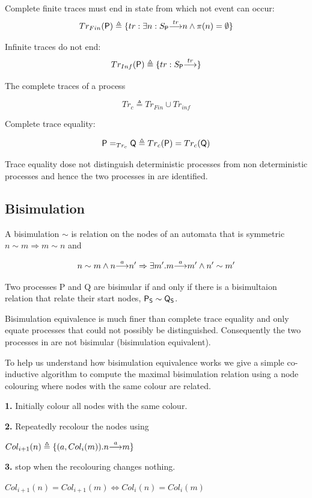 \documentclass[]{article}
\begin{document}
 Complete finite traces must end in state from which not event can occur:
 \[Tr_{Fin}({\sf P}) \triangleq \{ tr : \exists n : {S_{\sf P} }{\stackrel{tr}{\longrightarrow}}{n} \land \pi(n)=\emptyset\}\]

 Infinite traces  do not end:
 \[Tr_{Inf}({\sf P}) \triangleq \{ tr :  {S_{\sf P} }{\stackrel{tr}{\longrightarrow}}{} \}\]

 The  complete traces of a process

 \[Tr_c \triangleq Tr_{Fin}\cup Tr_{inf}\]

 Complete trace equality:

 \[{\sf P} =_{Tr_c} {\sf Q} \triangleq Tr_c({\sf P}) = Tr_c({\sf Q})\]

Trace equality dose not distinguish deterministic processes from non deterministic processes  and hence the two processes in  are identified.
 \subsection{Bisimulation}\label{sec:biscol}
  A bisimulation  $\sim$ is relation on the nodes of an automata  that is  symmetric  $n\sim m\Rightarrow m\sim n$  and

 \[ n\sim m \land {n}{\stackrel{a}{\longrightarrow}}{n'} \Rightarrow \exists m' . {m}{\stackrel{a}{\longrightarrow}}{m'}  \land n'\sim m' \]

 Two processes {\sf P} and {\sf Q} are bisimular if and only if there is a bisimultaion relation that relate their start nodes, ${\sf P_S\sim Q_S}$.

 Bisimulation equivalence is much finer than complete trace equality and  only equate processes that could not possibly be distinguished.
 Consequently the two processes in  are not bisimular (bisimulation equivalent).

 To help us understand how bisimulation equivalence works we give a simple co-inductive algorithm to compute the maximal  bisimulation relation  using a node colouring where  nodes with the same colour  are related.

\begin{center}\begin{minipage}{0.7\textwidth}

 {\bf 1.} Initially colour all nodes with the same colour.

{\bf 2.} Repeatedly recolour the nodes using
     \begin{center}
     $Col_{i+1}(n) \triangleq \{(a,Col_i(m)) .{n}{\stackrel{a}{\longrightarrow}}{m} \}$
     \end{center}

{\bf 3.} \hspace{0.25in} stop when  the recolouring changes nothing.
\begin{center}
     $Col_{i+1}(n) =Col_{i+1}(m) \Leftrightarrow Col_{i}(n) =Col_{i}(m)$
     \end{center}

\end{minipage} \end{center}
\end{document}
